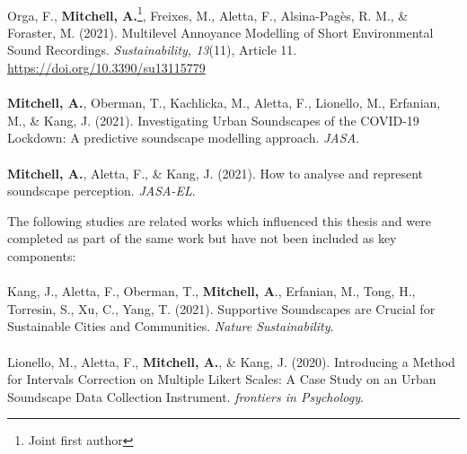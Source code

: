 \documentclass[oneside,fontsize=13pt,titlepage]{scrbook}
\begin{document}
\paragraph*{}
Orga, F., \textbf{Mitchell, A.}\footnote{Joint first author}, Freixes, M., Aletta, F., Alsina-Pagès, R. M., \& Foraster, M. (2021). Multilevel Annoyance Modelling of Short Environmental Sound Recordings. \emph{Sustainability, 13}(11), Article 11. \url{https://doi.org/10.3390/su13115779}

\paragraph*{}
\textbf{Mitchell, A.}, Oberman, T., Kachlicka, M., Aletta, F., Lionello, M., Erfanian, M., \& Kang, J. (2021). Investigating Urban Soundscapes of the COVID-19 Lockdown: A predictive soundscape modelling approach. \emph{JASA}.


\paragraph*{}
\textbf{Mitchell, A.}, Aletta, F., \& Kang, J. (2021). How to analyse and represent soundscape perception. \emph{JASA-EL}.




\newpage
The following studies are related works which influenced this thesis and were completed as part of the same work but have not been included as key components:

\paragraph*{}
Kang, J., Aletta, F., Oberman, T., \textbf{Mitchell, A}., Erfanian, M., Tong, H., Torresin, S., Xu, C., Yang, T. (2021). Supportive Soundscapes are Crucial for Sustainable Cities and Communities. \emph{Nature Sustainability}.

\paragraph*{}Lionello, M., Aletta, F., \textbf{Mitchell, A.}, \& Kang, J. (2020). Introducing a Method for Intervals Correction on Multiple Likert Scales: A Case Study on an Urban Soundscape Data Collection Instrument. \emph{frontiers in Psychology}.
\end{document}
